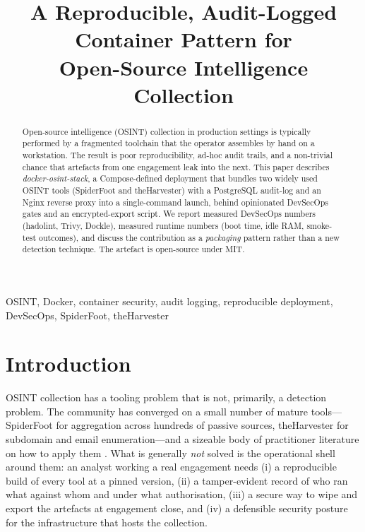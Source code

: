 \documentclass[conference,a4paper,10pt]{IEEEtran}
\begin{document}
\title{A Reproducible, Audit-Logged Container Pattern for\\Open-Source
       Intelligence Collection}

\author{
}

\maketitle

\begin{abstract}
Open-source intelligence (OSINT) collection in production settings is
typically performed by a fragmented toolchain that the operator
assembles by hand on a workstation. The result is poor
reproducibility, ad-hoc audit trails, and a non-trivial chance that
artefacts from one engagement leak into the next. This paper
describes \emph{docker-osint-stack}, a Compose-defined deployment
that bundles two widely used OSINT tools (SpiderFoot and theHarvester)
with a PostgreSQL audit-log and an Nginx reverse proxy into a
single-command launch, behind opinionated DevSecOps gates and an
encrypted-export script. We report measured DevSecOps numbers
(hadolint, Trivy, Dockle), measured runtime numbers (boot time, idle
RAM, smoke-test outcomes), and discuss the contribution as a
\emph{packaging} pattern rather than a new detection technique. The
artefact is open-source under MIT.
\end{abstract}

\begin{IEEEkeywords}
OSINT, Docker, container security, audit logging, reproducible
deployment, DevSecOps, SpiderFoot, theHarvester
\end{IEEEkeywords}

\section{Introduction}

OSINT collection has a tooling problem that is not, primarily, a
detection problem. The community has converged on a small number of
mature tools---SpiderFoot for aggregation across hundreds of passive
sources, theHarvester for subdomain and email enumeration---and a
sizeable body of practitioner literature on how to apply them
\cite{bazzell2023}. What is generally \emph{not} solved is the
operational shell around them: an analyst working a real engagement
needs (i) a reproducible build of every tool at a pinned version, (ii)
a tamper-evident record of who ran what against whom and under what
authorisation, (iii) a secure way to wipe and export the artefacts at
engagement close, and (iv) a defensible security posture for the
infrastructure that hosts the collection.
\end{document}
